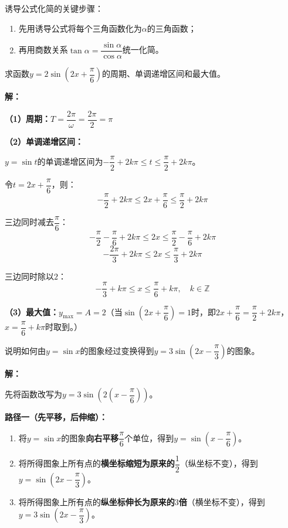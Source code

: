 \documentclass[12pt, a4paper]{ctexart}
\begin{document}
\begin{tipbox}[方法总结]
诱导公式化简的关键步骤：
\begin{enumerate}[leftmargin=2em]
  \item 先用诱导公式将每个三角函数化为$\alpha$的三角函数；
  \item 再用商数关系$\tan\alpha=\dfrac{\sin\alpha}{\cos\alpha}$统一化简。
\end{enumerate}
\end{tipbox}

\begin{examplebox}[【例题7】求正弦型函数的周期与单调区间]
求函数$y=2\sin\!\left(2x+\dfrac{\pi}{6}\right)$的周期、单调递增区间和最大值。
\end{examplebox}

\textbf{解：}

\textbf{（1）周期：}$T=\dfrac{2\pi}{\omega}=\dfrac{2\pi}{2}=\pi$

\textbf{（2）单调递增区间：}

$y=\sin t$的单调递增区间为$-\dfrac{\pi}{2}+2k\pi\leqslant t\leqslant\dfrac{\pi}{2}+2k\pi$。

令$t=2x+\dfrac{\pi}{6}$，则：
\[
  -\frac{\pi}{2}+2k\pi\leqslant 2x+\frac{\pi}{6}\leqslant\frac{\pi}{2}+2k\pi
\]

三边同时减去$\dfrac{\pi}{6}$：
\[
  -\frac{\pi}{2}-\frac{\pi}{6}+2k\pi\leqslant 2x\leqslant\frac{\pi}{2}-\frac{\pi}{6}+2k\pi
\]
\[
  -\frac{2\pi}{3}+2k\pi\leqslant 2x\leqslant\frac{\pi}{3}+2k\pi
\]

三边同时除以$2$：
\[
  \boxed{-\frac{\pi}{3}+k\pi\leqslant x\leqslant\frac{\pi}{6}+k\pi,\quad k\in\mathbb{Z}}
\]

\textbf{（3）最大值：}$y_{\max}=A=2$（当$\sin\!\left(2x+\dfrac{\pi}{6}\right)=1$时，即$2x+\dfrac{\pi}{6}=\dfrac{\pi}{2}+2k\pi$，$x=\dfrac{\pi}{6}+k\pi$时取到。）

\begin{examplebox}[【例题8】图象变换——由$y=\sin x$到$y=A\sin(\omega x+\varphi)$]
说明如何由$y=\sin x$的图象经过变换得到$y=3\sin\!\left(2x-\dfrac{\pi}{3}\right)$的图象。
\end{examplebox}

\textbf{解：}

先将函数改写为$y=3\sin\!\left(2\left(x-\dfrac{\pi}{6}\right)\right)$。

\textbf{路径一（先平移，后伸缩）：}

\begin{enumerate}[leftmargin=2em]
  \item 将$y=\sin x$的图象\textbf{向右平移}$\dfrac{\pi}{6}$个单位，得到$y=\sin\!\left(x-\dfrac{\pi}{6}\right)$。
  \item 将所得图象上所有点的\textbf{横坐标缩短为原来的}$\dfrac{1}{2}$（纵坐标不变），得到$y=\sin\!\left(2x-\dfrac{\pi}{3}\right)$。
  \item 将所得图象上所有点的\textbf{纵坐标伸长为原来的$3$倍}（横坐标不变），得到$y=3\sin\!\left(2x-\dfrac{\pi}{3}\right)$。
\end{enumerate}
\end{document}
